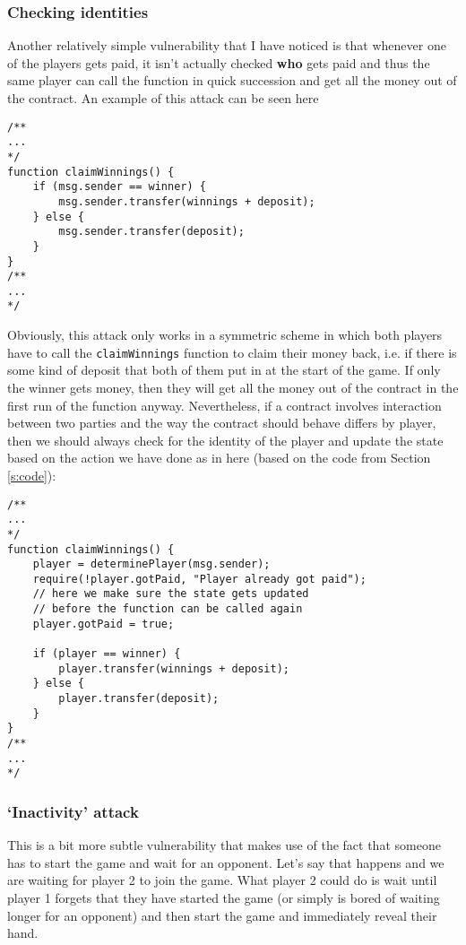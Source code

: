 \documentclass{article}
\begin{document}
    \subsubsection{Checking identities}
    Another relatively simple vulnerability that I have
    noticed is that whenever one of the players gets paid,
    it isn't actually checked {\bfseries who} gets paid and
    thus the same player can call the function in quick
    succession and get all the money out of the contract. An
    example of this attack can be seen here

    \begin{lstlisting}[language=Solidity]
/**
...
*/
function claimWinnings() {
    if (msg.sender == winner) {
        msg.sender.transfer(winnings + deposit);
    } else {
        msg.sender.transfer(deposit);
    }
}
/**
...
*/
    \end{lstlisting}

    \noindent Obviously, this attack only works in a
    symmetric scheme in which both players have to call the
    \verb|claimWinnings| function to claim their money back,
    i.e. if there is some kind of deposit that both of them
    put in at the start of the game. If only the winner gets
    money, then they will get all the money out of the
    contract in the first run of the function anyway.
    Nevertheless, if a contract involves interaction between
    two parties and the way the contract should behave
    differs by player, then we should always check for the
    identity of the player and update the state based on the
    action we have done as in here (based on the code from
    Section \ref{s:code}):
    
    \begin{lstlisting}[language=Solidity]
/**
...
*/
function claimWinnings() {
    player = determinePlayer(msg.sender);
    require(!player.gotPaid, "Player already got paid");
    // here we make sure the state gets updated
    // before the function can be called again
    player.gotPaid = true;

    if (player == winner) {
        player.transfer(winnings + deposit);
    } else {
        player.transfer(deposit);
    }
}
/**
...
*/
    \end{lstlisting}

    \subsubsection{`Inactivity' attack}
    This is a bit more subtle vulnerability that makes use
    of the fact that someone has to start the game and wait
    for an opponent. Let's say that happens and we are
    waiting for player 2 to join the game. What player 2
    could do is wait until player 1 forgets that they have
    started the game (or simply is bored of waiting longer
    for an opponent) and then start the game and immediately
    reveal their hand.
    \newline
\end{document}
